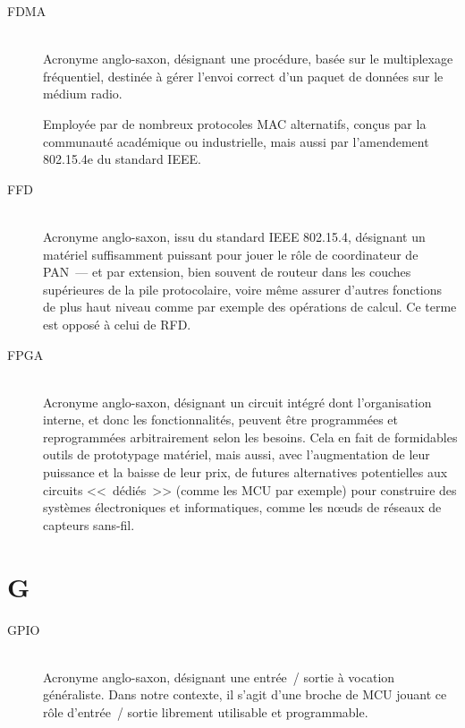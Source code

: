 \begin{description}

\item[FDMA]  \\
Acronyme anglo-saxon, désignant une procédure, basée sur le multiplexage
fréquentiel, destinée à gérer l'envoi correct d'un paquet de données sur
le médium radio.

Employée par de nombreux protocoles MAC alternatifs, conçus par la
communauté académique ou industrielle, mais aussi par l'amendement
802.15.4e du standard IEEE.

\item[FFD]  \\
Acronyme anglo-saxon, issu du standard IEEE 802.15.4, désignant un matériel
suffisamment puissant pour jouer le rôle de coordinateur de PAN~--- et par
extension, bien souvent de routeur dans les couches supérieures de la pile
protocolaire, voire même assurer d'autres fonctions de plus haut niveau
comme par exemple des opérations de calcul. Ce terme est opposé à celui
de RFD.

\item[FPGA]  \\
Acronyme anglo-saxon, désignant un circuit intégré dont l'organisation
interne, et donc les fonctionnalités, peuvent être programmées et
reprogrammées arbitrairement selon les besoins. Cela en fait de formidables
outils de prototypage matériel, mais aussi, avec l'augmentation de leur
puissance et la baisse de leur prix, de futures alternatives potentielles
aux circuits <<~dédiés~>> (comme les MCU par exemple) pour construire des
systèmes électroniques et informatiques, comme les n{\oe}uds de réseaux
de capteurs sans-fil.

\end{description}


\section*{G}

\begin{description}

\item[GPIO]  \\
Acronyme anglo-saxon, désignant une entrée~/ sortie à vocation généraliste.
Dans notre contexte, il s'agit d'une broche de MCU jouant ce rôle d'entrée~/
sortie librement utilisable et programmable.

\end{description}

